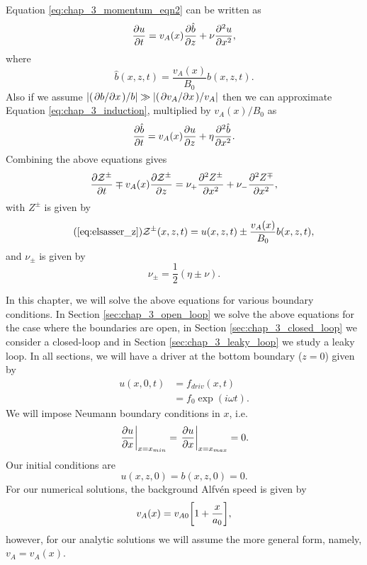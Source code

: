 Equation \eqref{eq:chap_3_momentum_eqn2} can be written as
\[\pdv{u}{t}=v_A(x)\pdv{\hat{b}}{z}+\nu\pdv[2]{u}{x},\]
where
\begin{equation}
    \hat{b}(x,z,t) = \frac{v_A(x)}{B_0}b(x,z,t).
\end{equation}
Also if we assume $\abs{(\pdv*{b}{x})/b}\gg\abs{(\pdv*{v_A}{x})/v_A}$ then we can approximate Equation \eqref{eq:chap_3_induction}, multiplied by $v_A(x)/B_0$ as 
\[\pdv{\hat{b}}{t}=v_A(x)\pdv{u}{z}+\eta\pdv[2]{\hat{b}}{x}.\]
Combining the above equations gives
\begin{equation}
    \label{eq:advection_diffusion_elsasser}
    \pdv{\mathcal{Z}^\pm}{t} \mp  v_A(x)\pdv{\mathcal{Z}^\pm}{z} = \nu_+ \pdv[2]{Z^\pm}{x} + \nu_-\pdv[2]{Z^\mp}{x},
\end{equation}
with $Z^{\pm}$ is given by 
\begin{equation}
    \tag{\ref{eq:elsasser_z}}
    \mathcal{Z}^\pm(x,z,t) = u(x,z,t) \pm \frac{v_A(x)}{B_0}b(x,z,t),
\end{equation}
and $\nu_{\pm}$ is given by
\begin{equation}
    \nu_\pm = \frac{1}{2}(\eta\pm\nu).
\end{equation}

In this chapter, we will solve the above equations for various boundary conditions. In Section \ref{sec:chap_3_open_loop} we solve the above equations for the case where the boundaries are open, in Section \ref{sec:chap_3_closed_loop} we consider a closed-loop and in Section \ref{sec:chap_3_leaky_loop} we study a leaky loop. In all sections, we will have a driver at the bottom boundary ($z=0$) given by
\begin{equation}
    \label{eq:driver_chap_3}
    \begin{aligned}
    u(x,0,t) &= f_{driv}(x,t) \\
    &= f_0\exp(i\omega t).
    \end{aligned}
\end{equation}
We will impose Neumann boundary conditions in $x$, i.e.
\begin{equation}
    \label{eq:neumann_bcs_chap_3}
    \left.\pdv{u}{x}\right|_{x=x_{min}}=\left.\pdv{u}{x}\right|_{x=x_{max}}=0.
\end{equation}
Our initial conditions are
\begin{equation}
    u(x,z,0) = b(x,z,0) = 0.
\end{equation}
For our numerical solutions, the background Alfv\'en speed is given by
\begin{equation}
    \label{eq:background_vA_chap_3}
    v_A(x) = v_{A0}\qty[1 + \frac{x}{a_0}],
\end{equation}
however, for our analytic solutions we will assume the more general form, namely, $v_A=v_A(x)$.

